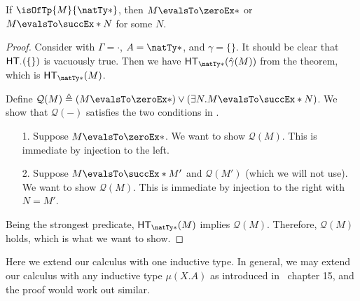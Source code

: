 \documentclass[letterpaper]{article}
\begin{document}
\begin{corollary}
  If $\isOfTp{M}{\natTy*}$, then $M \evalsTo \zeroEx*$ or $M \evalsTo \succEx*{N}$ for some $N$.
\end{corollary}
\begin{proof}
  Consider  with $\Gamma = \cdot$, $A = \natTy*$, and $\gamma = \{\}$. It should be clear that $\HT[\cdot](\{\})$ is vacuously true. Then we have $\HT[\natTy*](\hat{\gamma}(M))$ from the theorem, which is $\HT[\natTy*](M)$.

  Define $\mathcal{Q}(M) \triangleq (M \evalsTo \zeroEx*) \lor (\exists N. M \evalsTo \succEx*{N})$. We show that $\mathcal{Q}(-)$ satisfies the two conditions in .
  \begin{enumerate}
    \item [1.] Suppose $M \evalsTo \zeroEx*$. We want to show $\mathcal{Q}(M)$. This is immediate by injection to the left.
    \item [2.] Suppose $M \evalsTo \succEx*{M'}$ and $\mathcal{Q}(M')$ (which we will not use). We want to show $\mathcal{Q}(M)$. This is immediate by injection to the right with $N = M'$.
  \end{enumerate}
  Being the strongest predicate, $\HT[\natTy*](M)$ implies $\mathcal{Q}(M)$. Therefore, $\mathcal{Q}(M)$ holds, which is what we want to show.
\end{proof}

\begin{remark}
  Here we extend our calculus with one inductive type. In general, we may extend our calculus with any inductive type $\mu(X. A)$ as introduced in \PFPL\ chapter 15, and the proof would work out similar.
\end{remark}
\end{document}
